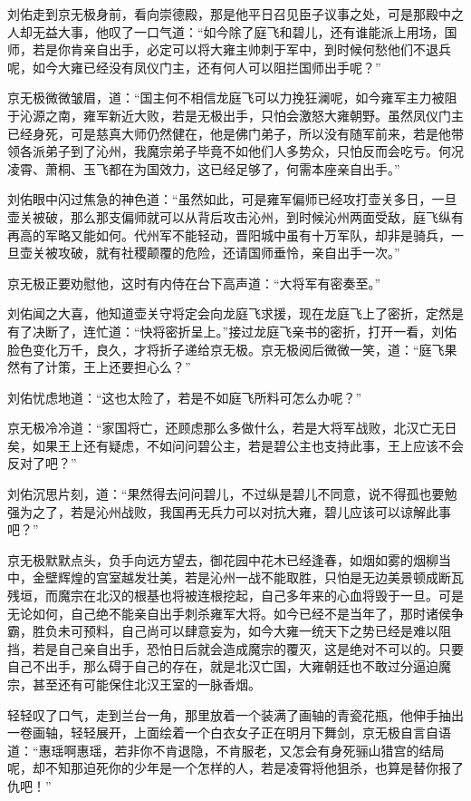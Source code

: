 刘佑走到京无极身前，看向崇德殿，那是他平日召见臣子议事之处，可是那殿中之人却无益大事，他叹了一口气道：“如今除了庭飞和碧儿，还有谁能派上用场，国师，若是你肯亲自出手，必定可以将大雍主帅刺于军中，到时候何愁他们不退兵呢，如今大雍已经没有凤仪门主，还有何人可以阻拦国师出手呢？”

京无极微微皱眉，道：“国主何不相信龙庭飞可以力挽狂澜呢，如今雍军主力被阻于沁源之南，雍军新近大败，若是无极出手，只怕会激怒大雍朝野。虽然凤仪门主已经身死，可是慈真大师仍然健在，他是佛门弟子，所以没有随军前来，若是他带领各派弟子到了沁州，我魔宗弟子毕竟不如他们人多势众，只怕反而会吃亏。何况凌霄、萧桐、玉飞都在为国效力，这已经足够了，何需本座亲自出手。”

刘佑眼中闪过焦急的神色道：“虽然如此，可是雍军偏师已经攻打壶关多日，一旦壶关被破，那么那支偏师就可以从背后攻击沁州，到时候沁州两面受敌，庭飞纵有再高的军略又能如何。代州军不能轻动，晋阳城中虽有十万军队，却非是骑兵，一旦壶关被攻破，就有社稷颠覆的危险，还请国师垂怜，亲自出手一次。”

京无极正要劝慰他，这时有内侍在台下高声道：“大将军有密奏至。”

刘佑闻之大喜，他知道壶关守将定会向龙庭飞求援，现在龙庭飞上了密折，定然是有了决断了，连忙道：“快将密折呈上。”接过龙庭飞亲书的密折，打开一看，刘佑脸色变化万千，良久，才将折子递给京无极。京无极阅后微微一笑，道：“庭飞果然有了计策，王上还要担心么？”

刘佑忧虑地道：“这也太险了，若是不如庭飞所料可怎么办呢？”

京无极冷冷道：“家国将亡，还顾虑那么多做什么，若是大将军战败，北汉亡无日矣，如果王上还有疑虑，不如问问碧公主，若是碧公主也支持此事，王上应该不会反对了吧？”

刘佑沉思片刻，道：“果然得去问问碧儿，不过纵是碧儿不同意，说不得孤也要勉强为之了，若是沁州战败，我国再无兵力可以对抗大雍，碧儿应该可以谅解此事吧？”

京无极默默点头，负手向远方望去，御花园中花木已经逢春，如烟如雾的烟柳当中，金壁辉煌的宫室越发壮美，若是沁州一战不能取胜，只怕是无边美景顿成断瓦残垣，而魔宗在北汉的根基也将被连根挖起，自己多年来的心血将毁于一旦。可是无论如何，自己绝不能亲自出手刺杀雍军大将。如今已经不是当年了，那时诸侯争霸，胜负未可预料，自己尚可以肆意妄为，如今大雍一统天下之势已经是难以阻挡，若是自己亲自出手，恐怕日后就会造成魔宗的覆灭，这是绝对不可以的。只要自己不出手，那么碍于自己的存在，就是北汉亡国，大雍朝廷也不敢过分逼迫魔宗，甚至还有可能保住北汉王室的一脉香烟。

轻轻叹了口气，走到兰台一角，那里放着一个装满了画轴的青瓷花瓶，他伸手抽出一卷画轴，轻轻展开，上面绘着一个白衣女子正在明月下舞剑，京无极自言自语道：“惠瑶啊惠瑶，若非你不肯退隐，不肯服老，又怎会有身死骊山猎宫的结局呢，却不知那迫死你的少年是一个怎样的人，若是凌霄将他狙杀，也算是替你报了仇吧！”

